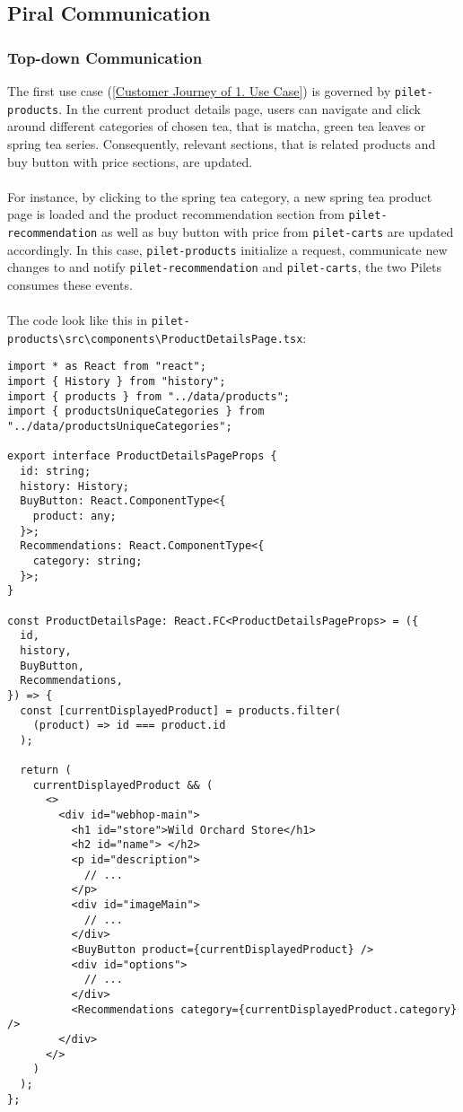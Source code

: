 \documentclass[a4paper]{book}
\begin{document}
\subsection{Piral Communication}
\subsubsection{Top-down Communication}
The first use case (\ref{Customer Journey of 1. Use Case}) is governed by \verb|pilet-products|. In the current product details page, users can navigate and click around different categories of chosen tea, that is matcha, green tea leaves or spring tea series. Consequently, relevant sections, that is related products and buy button with price sections, are updated.
\\ \\
For instance, by clicking to the spring tea category, a new spring tea product page is loaded and the product recommendation section from \verb|pilet-recommendation| as well as buy button with price from \verb|pilet-carts| are updated accordingly. In this case, \verb|pilet-products| initialize a request, communicate new changes to and notify \verb|pilet-recommendation| and \verb|pilet-carts|, the two Pilets consumes these events.
\\ \\
The code look like this in \verb|pilet-products\src\components\ProductDetailsPage.tsx|:
\begin{lstlisting}[caption={ProductDetailsPage passes product data directly to extended components}]
import * as React from "react";
import { History } from "history";
import { products } from "../data/products";
import { productsUniqueCategories } from "../data/productsUniqueCategories";

export interface ProductDetailsPageProps {
  id: string;
  history: History;
  BuyButton: React.ComponentType<{
    product: any;
  }>;
  Recommendations: React.ComponentType<{
    category: string;
  }>;
}

const ProductDetailsPage: React.FC<ProductDetailsPageProps> = ({
  id,
  history,
  BuyButton,
  Recommendations,
}) => {
  const [currentDisplayedProduct] = products.filter(
    (product) => id === product.id
  );

  return (
    currentDisplayedProduct && (
      <>
        <div id="webhop-main">
          <h1 id="store">Wild Orchard Store</h1>
          <h2 id="name"> </h2>
          <p id="description">
            // ...
          </p>
          <div id="imageMain">
            // ...
          </div>
          <BuyButton product={currentDisplayedProduct} />
          <div id="options">
            // ...
          </div>
          <Recommendations category={currentDisplayedProduct.category} />
        </div>
      </>
    )
  );
};
\end{lstlisting}
\end{document}
